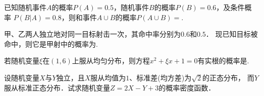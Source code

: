\documentclass[plain,noanswer,medmath]{../../template/jnuexam}
\begin{document}


\begin{problem}
已知随机事件$A$的概率$P(A)=0.5$，随机事件$B$的概率$P(B)=0.6$，及条件概率
$P(B|A)=0.8$，则和事件$A\cup B$的概率$P(A\cup B)=$\fillin{}.
\end{problem}


\begin{problem}
甲、乙两人独立地对同一目标射击一次，其命中率分别为$0.6$和$0.5$．
现已知目标被命中，则它是甲射中的概率为\fillin{}.
\end{problem}


\begin{problem}
若随机变量$\xi$在$(1,6)$上服从均匀分布，则方程$x^2+\xi x+1=0$有实根的概率是\fillin{}.
\end{problem}



\begin{problem}
设随机变量$X$与$Y$独立，且$X$服从均值为$1$、标准差(均方差)为$\sqrt{2}$的正态分布，
而$Y$服从标准正态分布．试求随机变量$Z=2X-Y+3$的概率密度函数．
\end{problem}
\end{document}
